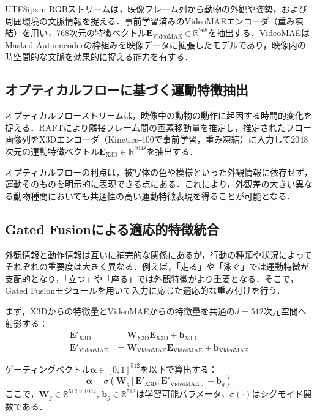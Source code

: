 \documentclass[twocolumn]{svjour3}
\begin{document}
\begin{CJK}{UTF8}{ipxm}
RGBストリームは，映像フレーム列から動物の外観や姿勢，および周囲環境の文脈情報を捉える．事前学習済みのVideoMAE\cite{tong2022videomae}エンコーダ（重み凍結）を用い，768次元の特徴ベクトル$\mathbf{E}_{\mathrm{VideoMAE}} \in \mathbb{R}^{768}$を抽出する．VideoMAEはMasked Autoencoderの枠組みを映像データに拡張したモデルであり，映像内の時空間的な文脈を効果的に捉える能力を有する．

\subsection{オプティカルフローに基づく運動特徴抽出}

オプティカルフローストリームは，映像中の動物の動作に起因する時間的変化を捉える．RAFT\cite{teed2020raft}により隣接フレーム間の画素移動量を推定し，推定されたフロー画像列をX3D\cite{feichtenhofer2020x3d}エンコーダ（Kinetics-400で事前学習，重み凍結）に入力して2048次元の運動特徴ベクトル$\mathbf{E}_{\mathrm{X3D}} \in \mathbb{R}^{2048}$を抽出する．

オプティカルフローの利点は，被写体の色や模様といった外観情報に依存せず，運動そのものを明示的に表現できる点にある．これにより，外観差の大きい異なる動物種間においても共通性の高い運動特徴表現を得ることが可能となる．

\subsection{Gated Fusionによる適応的特徴統合}

外観情報と動作情報は互いに補完的な関係にあるが，行動の種類や状況によってそれぞれの重要度は大きく異なる．例えば，「走る」や「泳ぐ」では運動特徴が支配的となり，「立つ」や「座る」では外観特徴がより重要となる．そこで，Gated Fusionモジュールを用いて入力に応じた適応的な重み付けを行う．

まず，X3Dからの特徴量とVideoMAEからの特徴量を共通の$d = 512$次元空間へ射影する：
\begin{align}
  \mathbf{E}'_{\mathrm{X3D}} &= \mathbf{W}_{\mathrm{X3D}} \mathbf{E}_{\mathrm{X3D}} + \mathbf{b}_{\mathrm{X3D}} \\
  \mathbf{E}'_{\mathrm{VideoMAE}} &= \mathbf{W}_{\mathrm{VideoMAE}} \mathbf{E}_{\mathrm{VideoMAE}} + \mathbf{b}_{\mathrm{VideoMAE}}
\end{align}

ゲーティングベクトル$\boldsymbol{\alpha} \in [0,1]^{512}$を以下で算出する：
\begin{equation}
  \boldsymbol{\alpha} = \sigma(\mathbf{W}_g[\mathbf{E}'_{\mathrm{X3D}}; \mathbf{E}'_{\mathrm{VideoMAE}}] + \mathbf{b}_g)
\end{equation}
ここで，$\mathbf{W}_g \in \mathbb{R}^{512 \times 1024}$, $\mathbf{b}_g \in \mathbb{R}^{512}$は学習可能パラメータ，$\sigma(\cdot)$はシグモイド関数である．


\end{CJK}
\end{document}
